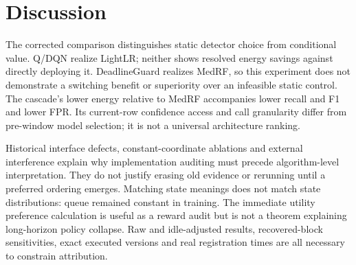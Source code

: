 \section{Discussion}\label{sec:discuss}
The corrected comparison distinguishes static detector choice from conditional value. Q/DQN realize LightLR; neither shows resolved energy savings against directly deploying it. DeadlineGuard realizes MedRF, so this experiment does not demonstrate a switching benefit or superiority over an infeasible static control. The cascade's lower energy relative to MedRF accompanies lower recall and F1 and lower FPR. Its current-row confidence access and call granularity differ from pre-window model selection; it is not a universal architecture ranking.

Historical interface defects, constant-coordinate ablations and external interference explain why implementation auditing must precede algorithm-level interpretation. They do not justify erasing old evidence or rerunning until a preferred ordering emerges. Matching state meanings does not match state distributions: queue remained constant in training. The immediate utility preference calculation is useful as a reward audit but is not a theorem explaining long-horizon policy collapse. Raw and idle-adjusted results, recovered-block sensitivities, exact executed versions and real registration times are all necessary to constrain attribution.
